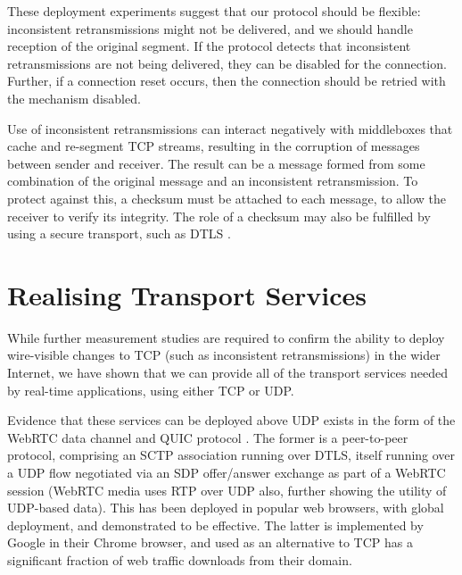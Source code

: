 \documentclass{sig-alternate-05-2015}
\begin{document}
These deployment experiments suggest that our protocol should be
flexible: inconsistent retransmissions might not be delivered, and we should
handle reception of the original segment. If the protocol detects that
inconsistent retransmissions are not being delivered, they
can be disabled for the connection. Further, if a connection reset occurs,
then the connection should be retried with the mechanism disabled.

Use of inconsistent retransmissions can interact negatively with
middleboxes that cache and re-segment TCP streams, resulting in the corruption of
messages between sender and receiver. The result can be a message formed
from some combination of the
original message and an inconsistent retransmission.
To protect against this, a checksum
must be attached to each message, to allow the receiver to verify its
integrity. The role of a checksum may also be fulfilled by using a secure
transport, such as DTLS \cite{rfc:6347}.

\section{Realising Transport Services}
\label{sec:realising}

While further measurement studies are required to confirm the ability to
deploy wire-visible changes to TCP (such as inconsistent retransmissions)
in the wider Internet,
we have shown that we can provide all of the transport services needed by
real-time applications, using either TCP or UDP.

Evidence that these services can be deployed above UDP exists in the form
of the WebRTC data channel \cite{draft-ietf-rtcweb-data-channel-13} and
QUIC protocol \cite{draft-tsvwg-quic-protocol-02}.
The former is a peer-to-peer protocol, comprising an SCTP association
running over DTLS, itself running over a UDP flow negotiated via an SDP
\cite{RFC4566} offer/answer exchange \cite{RFC3264} as part of a WebRTC
session \cite{jennings:2013:rtcweb} (WebRTC media uses RTP
over UDP also, further showing the utility of UDP-based data).
This has been deployed in popular web browsers, with global deployment, and
demonstrated to be effective.  The latter is implemented by Google in their
Chrome browser, and used as an alternative to TCP has a significant
fraction of web traffic downloads from their domain.

\end{document}
